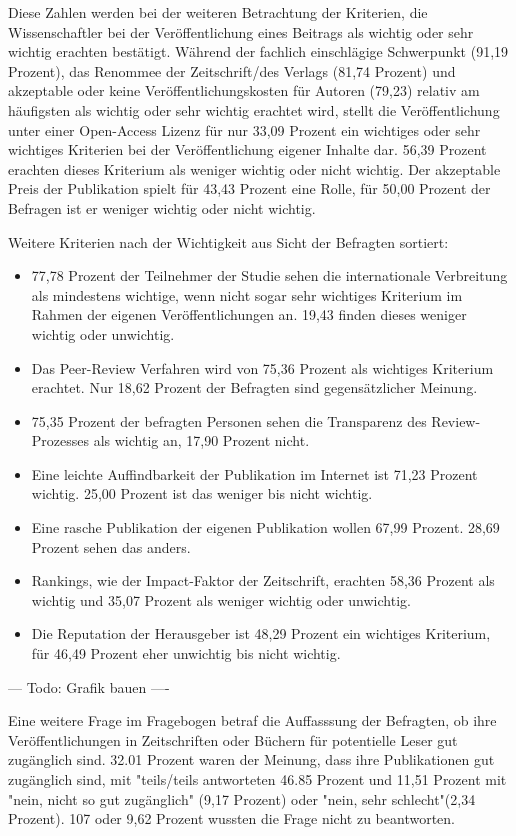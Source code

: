 Diese Zahlen werden bei der weiteren Betrachtung der Kriterien, die Wissenschaftler bei der Veröffentlichung eines Beitrags als wichtig oder sehr wichtig erachten bestätigt. Während der fachlich einschlägige Schwerpunkt (91,19 Prozent), das Renommee der Zeitschrift/des Verlags (81,74 Prozent) und akzeptable oder keine Veröffentlichungskosten für Autoren (79,23) relativ am häufigsten als wichtig oder sehr wichtig erachtet wird, stellt die Veröffentlichung unter einer Open-Access Lizenz für nur 33,09 Prozent ein wichtiges oder sehr wichtiges Kriterien bei der Veröffentlichung eigener Inhalte dar. 56,39 Prozent erachten dieses Kriterium als weniger wichtig oder nicht wichtig. Der akzeptable Preis der Publikation spielt für 43,43 Prozent eine Rolle, für 50,00 Prozent der Befragen ist er weniger wichtig oder nicht wichtig.

Weitere Kriterien nach der Wichtigkeit aus Sicht der Befragten sortiert:
\begin{itemize}
\item 77,78 Prozent der Teilnehmer der Studie sehen die internationale Verbreitung als mindestens wichtige, wenn nicht sogar sehr wichtiges Kriterium im Rahmen der eigenen Veröffentlichungen an. 19,43 finden dieses weniger wichtig oder unwichtig.
\item Das Peer-Review Verfahren wird von 75,36 Prozent als wichtiges Kriterium erachtet. Nur 18,62 Prozent der Befragten sind gegensätzlicher Meinung.
\item 75,35 Prozent der befragten Personen sehen die Transparenz des Review-Prozesses als wichtig an, 17,90 Prozent nicht.
\item Eine leichte Auffindbarkeit der Publikation im Internet ist 71,23 Prozent wichtig. 25,00 Prozent ist das weniger bis nicht wichtig.
\item Eine rasche Publikation der eigenen Publikation wollen 67,99 Prozent. 28,69 Prozent sehen das anders.
\item Rankings, wie der Impact-Faktor der Zeitschrift, erachten 58,36 Prozent als wichtig und 35,07 Prozent als weniger wichtig oder unwichtig.
\item Die Reputation der Herausgeber ist 48,29 Prozent ein wichtiges Kriterium, für 46,49 Prozent eher unwichtig bis nicht wichtig.
\end{itemize}

--- Todo: Grafik bauen ----

Eine weitere Frage im Fragebogen betraf die Auffasssung der Befragten, ob ihre Veröffentlichungen in Zeitschriften oder Büchern für potentielle Leser gut zugänglich sind. 32.01 Prozent waren der Meinung, dass ihre Publikationen gut zugänglich sind, mit "teils/teils antworteten 46.85 Prozent und 11,51 Prozent mit "nein, nicht so gut zugänglich" (9,17 Prozent) oder "nein, sehr schlecht"(2,34 Prozent). 107 oder 9,62 Prozent wussten die Frage nicht zu beantworten.


